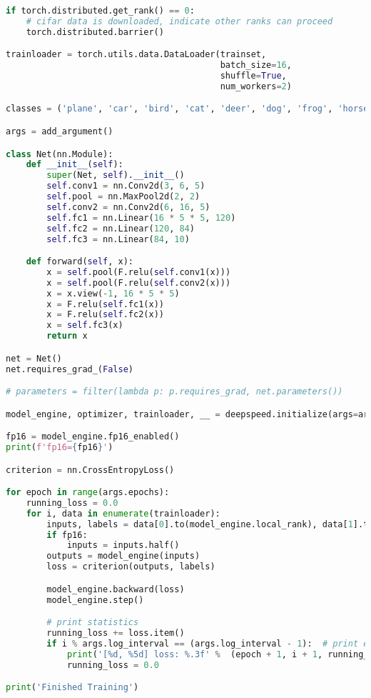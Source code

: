 \begin{lstlisting}[language=Python]
if torch.distributed.get_rank() == 0:
    # cifar data is downloaded, indicate other ranks can proceed
    torch.distributed.barrier()

trainloader = torch.utils.data.DataLoader(trainset,
                                          batch_size=16,
                                          shuffle=True,
                                          num_workers=2)

classes = ('plane', 'car', 'bird', 'cat', 'deer', 'dog', 'frog', 'horse', 'ship', 'truck')

args = add_argument()

class Net(nn.Module):
    def __init__(self):
        super(Net, self).__init__()
        self.conv1 = nn.Conv2d(3, 6, 5)
        self.pool = nn.MaxPool2d(2, 2)
        self.conv2 = nn.Conv2d(6, 16, 5)
        self.fc1 = nn.Linear(16 * 5 * 5, 120)
        self.fc2 = nn.Linear(120, 84)
        self.fc3 = nn.Linear(84, 10)

    def forward(self, x):
        x = self.pool(F.relu(self.conv1(x)))
        x = self.pool(F.relu(self.conv2(x)))
        x = x.view(-1, 16 * 5 * 5)
        x = F.relu(self.fc1(x))
        x = F.relu(self.fc2(x))
        x = self.fc3(x)
        return x

net = Net()
net.requires_grad_(False)

# parameters = filter(lambda p: p.requires_grad, net.parameters())

model_engine, optimizer, trainloader, __ = deepspeed.initialize(args=args, model=net, model_parameters=net.parameters(), training_data=trainset)

fp16 = model_engine.fp16_enabled()
print(f'fp16={fp16}')

criterion = nn.CrossEntropyLoss()

for epoch in range(args.epochs):
    running_loss = 0.0
    for i, data in enumerate(trainloader):
        inputs, labels = data[0].to(model_engine.local_rank), data[1].to(model_engine.local_rank)
        if fp16:
            inputs = inputs.half()
        outputs = model_engine(inputs)
        loss = criterion(outputs, labels)

        model_engine.backward(loss)
        model_engine.step()

        # print statistics
        running_loss += loss.item()
        if i % args.log_interval == (args.log_interval - 1):  # print every log_interval mini-batches
            print('[%d, %5d] loss: %.3f' %  (epoch + 1, i + 1, running_loss / args.log_interval))
            running_loss = 0.0

print('Finished Training')
\end{lstlisting}